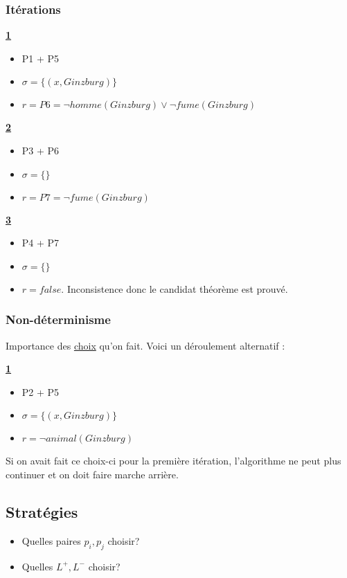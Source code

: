 \subsubsection{Itérations}

\textbf{\underline{1}}
\begin{itemize}
  \item P1 + P5
  \item $\sigma = \big\{ (x, Ginzburg) \big\}$
  \item $r = P6 = \neg homme(Ginzburg) \vee \neg fume(Ginzburg)$
\end{itemize}

\textbf{\underline{2}}
\begin{itemize}
  \item P3 + P6
  \item $\sigma = \big\{ \big\}$
  \item $r = P7 = \neg fume(Ginzburg)$
\end{itemize}

\textbf{\underline{3}}
\begin{itemize}
  \item P4 + P7
  \item $\sigma = \big\{ \big\}$
  \item $r = false.$ Inconsistence donc le candidat théorème est prouvé.
\end{itemize}

\subsubsection{Non-déterminisme}

Importance des \underline{choix} qu'on fait. Voici un déroulement alternatif :

\textbf{\underline{1}}
\begin{itemize}
  \item P2 + P5
  \item $\sigma = \big\{ (x, Ginzburg) \big\}$
  \item $r = \neg animal(Ginzburg)$
\end{itemize}

Si on avait fait ce choix-ci pour la première itération, l'algorithme ne peut plus continuer et on doit faire marche arrière.

\subsection{Stratégies}

\begin{itemize}
  \item Quelles paires $p_i, p_j$ choisir?
  \item Quelles $L^{+}, L^{-}$ choisir?
\end{itemize}

